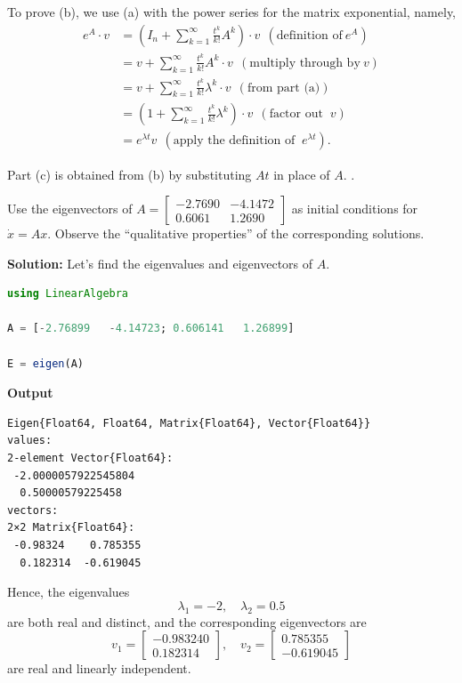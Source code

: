 To prove (b), we use (a) with the power series for the matrix exponential, namely,
\begin{align*}
   e^A \cdot v &= \left(I_n + \sum_{k=1}^\infty \frac{t^k}{k!} A^k \right) \cdot v  ~~(\text{definition of}~e^A) \\
    &=   v +  \sum_{k=1}^\infty \frac{t^k}{k!} A^k \cdot v ~~(\text{multiply through by}~v)\\
    &= v + \sum_{k=1}^\infty \frac{t^k}{k!} \lambda^k \cdot v ~~(\text{from part (a)})\\
     &= \left( 1+ \sum_{k=1}^\infty \frac{t^k}{k!} \lambda^k \right) \cdot v ~~(\text{factor out }~v)\\[1em]
     &= e^{\lambda t} v~~ (\text{apply the definition of }~e^{\lambda t}).
\end{align*}

Part (c) is obtained from (b) by substituting $At$ in place of $A$. 
\Qed.

\bigskip

\begin{example}
\label{ex:FirstPeekComplexExponentials}
    Use the eigenvectors of $A=\left[
\begin{array}{rr}
-2.7690 & -4.1472 \\
0.6061 & 1.2690 
\end{array}
\right]$ as initial conditions for $\dot{x} = Ax.$ Observe the ``qualitative properties'' of the corresponding solutions. 
\end{example}
\textbf{Solution:}
Let's find the eigenvalues and eigenvectors of $A$.
\begin{lstlisting}[language=Julia,style=mystyle]
using LinearAlgebra

A = [-2.76899   -4.14723; 0.606141   1.26899]

E = eigen(A)
\end{lstlisting}
\textbf{Output} 
\begin{verbatim}
Eigen{Float64, Float64, Matrix{Float64}, Vector{Float64}}
values:
2-element Vector{Float64}:
 -2.0000057922545804
  0.50000579225458
vectors:
2×2 Matrix{Float64}:
 -0.98324    0.785355
  0.182314  -0.619045
\end{verbatim}

Hence, the eigenvalues 
$$ \lambda_1 = -2, \quad \lambda_2 = 0.5$$
are both real and distinct, and the corresponding eigenvectors are 
$$v_1 = \left[
\begin{array}{r}
-0.983240  \\
 0.182314
\end{array}
\right], \quad v_2 = 
\left[
\begin{array}{r}
0.785355\\
-0.619045
\end{array}
\right]
$$
are real and linearly independent. \\

